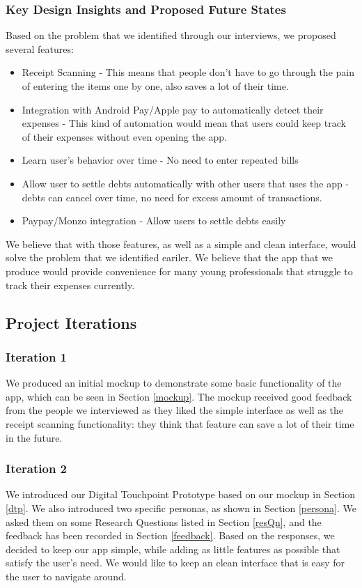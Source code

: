 \documentclass[a4wide, 11pt]{article}
\begin{document}
\subsubsection{Key Design Insights and Proposed Future States}

Based on the problem that we identified through our interviews, we proposed several features:
\begin{itemize}
\item Receipt Scanning - This means that people don't have to go through the pain of entering the items one by one, also saves a lot of their time.
\item Integration with Android Pay/Apple pay to automatically detect their expenses - This kind of automation would mean that users could keep track of their expenses without even opening the app.
\item Learn user's behavior over time - No need to enter repeated bills
\item Allow user to settle debts automatically with other users that uses the app - debts can cancel over time, no need for excess amount of transactions.
\item Paypay/Monzo integration - Allow users to settle debts easily
\end{itemize} 

We believe that with those features, as well as a simple and clean interface, would solve the problem that we identified eariler. We believe that the app that we produce would provide convenience for many young professionals that struggle to track their expenses currently.

\subsection{Project Iterations}

\subsubsection{Iteration 1}

We produced an initial mockup to demonstrate some basic functionality of the app, which can be seen in Section \ref{mockup}. The mockup received good feedback from the people we interviewed as they liked the simple interface as well as the receipt scanning functionality: they think that feature can save a lot of their time in the future.

\subsubsection{Iteration 2}
We introduced our Digital Touchpoint Prototype based on our mockup in Section \ref{dtp}. We also introduced two specific personas, as shown in Section \ref{persona}. We asked them on some Research Questions listed in Section \ref{resQn}, and the feedback has been recorded in Section \ref{feedback}. 
Based on the responses, we decided to keep our app simple, while adding as little features as possible that satisfy the user's need. We would like to keep an clean interface that is easy for the user to navigate around.
\end{document}
